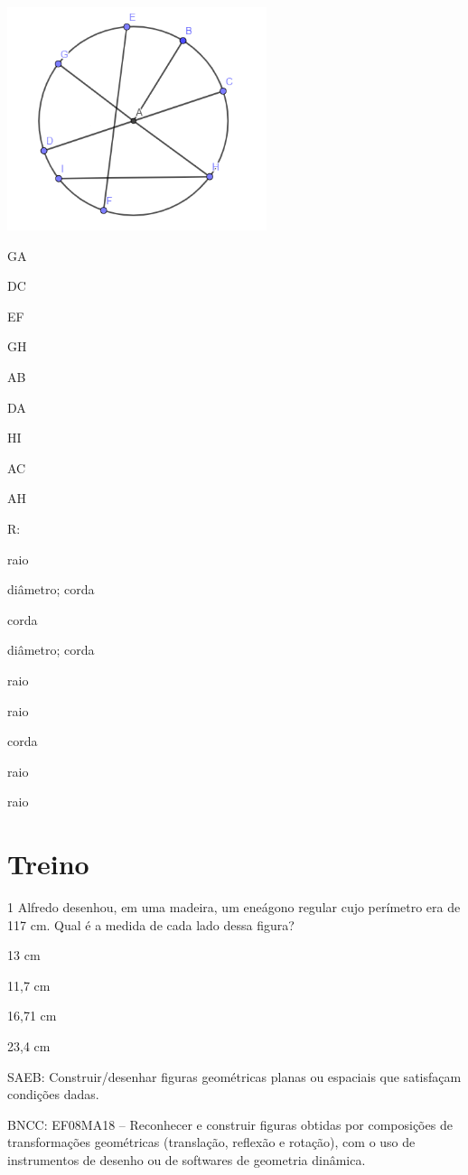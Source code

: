 {\includegraphics[width=2.98681in,height=2.57292in]{./imgSAEB_8_MAT/media/image12.png}
\item GA
\item DC
\item EF
\item GH
\item AB
\item DA
\item HI
\item AC
\item AH

R:
\item raio
\item diâmetro; corda
\item corda
\item diâmetro; corda
\item raio
\item raio
\item corda
\item raio
\item raio

\section{Treino}

\num{1} Alfredo desenhou, em uma madeira, um eneágono regular cujo perímetro
era de 117 cm. Qual é a medida de cada lado dessa figura?
\item 13 cm
\item 11,7 cm
\item 16,71 cm
\item 23,4 cm

SAEB: Construir/desenhar figuras geométricas planas ou espaciais que
satisfaçam condições dadas.

BNCC: EF08MA18 -- Reconhecer e construir figuras obtidas por composições
de transformações geométricas (translação, reflexão e rotação), com o
uso de instrumentos de desenho ou de softwares de geometria dinâmica.

}
